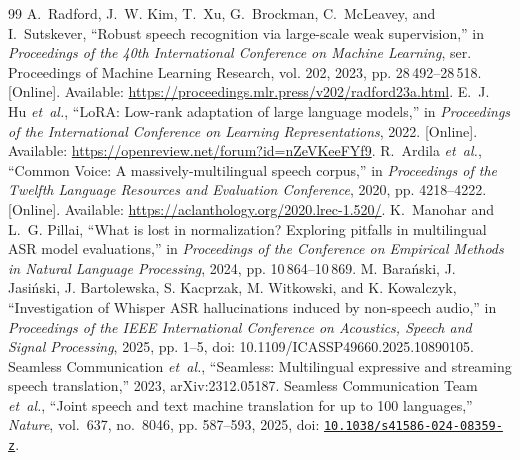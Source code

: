 \begin{thebibliography}{99}
A.~Radford, J.~W. Kim, T.~Xu, G.~Brockman, C.~McLeavey, and I.~Sutskever, ``{Robust speech recognition via large-scale weak supervision},'' in \emph{Proceedings of the 40th International Conference on Machine Learning}, ser. Proceedings of Machine Learning Research, vol. 202, 2023, pp. 28\,492--28\,518. [Online]. Available: \url{https://proceedings.mlr.press/v202/radford23a.html}.
\BIBentrySTDinterwordspacing
{}
\BIBentryALTinterwordspacing
E.~J. Hu \emph{et~al.}, ``{LoRA: Low-rank adaptation of large language models},'' in \emph{Proceedings of the International Conference on Learning Representations}, 2022. [Online]. Available: \url{https://openreview.net/forum?id=nZeVKeeFYf9}.
\BIBentrySTDinterwordspacing
{}
R.~Ardila \emph{et~al.}, ``Common Voice: A massively-multilingual speech corpus,'' in \emph{Proceedings of the Twelfth Language Resources and Evaluation Conference}, 2020, pp. 4218--4222. [Online]. Available: \url{https://aclanthology.org/2020.lrec-1.520/}.
K.~Manohar and L.~G. Pillai, ``{What is lost in normalization? Exploring pitfalls in multilingual ASR model evaluations},'' in \emph{Proceedings of the Conference on Empirical Methods in Natural Language Processing}, 2024, pp. 10\,864--10\,869.
 M. Bara\'nski, J. Jasi\'nski, J. Bartolewska, S. Kacprzak, M. Witkowski, and K. Kowalczyk, ``Investigation of Whisper ASR hallucinations induced by non-speech audio,'' in \textit{Proceedings of the IEEE International Conference on Acoustics, Speech and Signal Processing}, 2025, pp. 1--5, doi: 10.1109/ICASSP49660.2025.10890105.
\BIBentryALTinterwordspacing
{Seamless Communication} \emph{et~al.}, ``{Seamless: Multilingual expressive and streaming speech translation},'' 2023, arXiv:2312.05187.
\BIBentrySTDinterwordspacing
{}
{Seamless Communication Team} \emph{et~al.}, ``Joint speech and text machine translation for up to 100 languages,'' \emph{Nature}, vol.~637, no.~8046, pp. 587--593, 2025, doi: \href{https://doi.org/10.1038/s41586-024-08359-z}{\nolinkurl{10.1038/s41586-024-08359-z}}.
\end{thebibliography}
